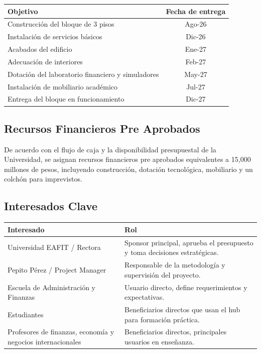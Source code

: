\begin{tabularx}{\textwidth}{|X|c|}
\hline
\textbf{Objetivo} & \textbf{Fecha de entrega} \\
\hline
Construcción del bloque de 3 pisos & Ago-26 \\
\hline
Instalación de servicios básicos & Dic-26 \\
\hline
Acabados del edificio & Ene-27 \\
\hline
Adecuación de interiores & Feb-27 \\
\hline
Dotación del laboratorio financiero y simuladores & May-27 \\
\hline
Instalación de mobiliario académico & Jul-27 \\
\hline
Entrega del bloque en funcionamiento & Dic-27 \\
\hline
\end{tabularx}

\subsection{Recursos Financieros Pre Aprobados}

De acuerdo con el flujo de caja y la disponibilidad presupuestal de la Universidad, se asignan recursos financieros pre aprobados equivalentes a 15{,}000 millones de pesos, incluyendo construcción, dotación tecnológica, mobiliario y un colchón para imprevistos.

\subsection{Interesados Clave}

\begin{tabularx}{\textwidth}{|X|X|}
\hline
\textbf{Interesado} & \textbf{Rol} \\
\hline
Universidad EAFIT / Rectora & Sponsor principal, aprueba el presupuesto y toma decisiones estratégicas. \\
\hline
Pepito Pérez / Project Manager & Responsable de la metodología y supervisión del proyecto. \\
\hline
Escuela de Administración y Finanzas & Usuario directo, define requerimientos y expectativas. \\
\hline
Estudiantes & Beneficiarios directos que usan el hub para formación práctica. \\
\hline
Profesores de finanzas, economía y negocios internacionales & Beneficiarios directos, principales usuarios en enseñanza. \\
\hline
\end{tabularx}

